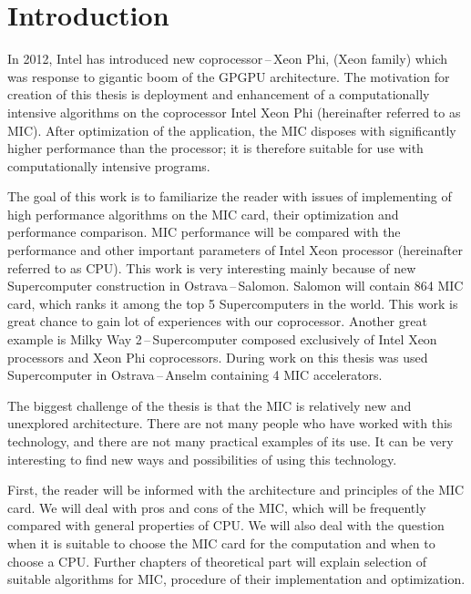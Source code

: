 

\chapter{Introduction}
In 2012, Intel has introduced new coprocessor\,--\,Xeon Phi, (Xeon family) which was response to gigantic boom of the GPGPU architecture. The motivation for creation of this thesis is deployment and enhancement of a computationally intensive algorithms on the coprocessor Intel Xeon Phi (hereinafter referred to as MIC). After optimization of the application, the MIC disposes with significantly higher performance than the processor; it is therefore suitable for use with computationally intensive programs.

\par The goal of this work is to familiarize the reader with issues of implementing of high performance algorithms on the MIC card, their optimization and performance comparison. MIC performance will be compared with the performance and other important parameters of Intel Xeon processor (hereinafter referred to as CPU). This work is very interesting mainly because of new Supercomputer construction in Ostrava\,--\,Salomon. Salomon will contain 864 MIC card, which ranks it among the top 5 Supercomputers in the world. This work is great chance to gain lot of experiences with our coprocessor. Another great example is Milky Way 2\,--\,Supercomputer composed exclusively of Intel Xeon processors and Xeon Phi coprocessors. During work on this thesis was used Supercomputer in Ostrava\,--\,Anselm containing 4 MIC accelerators.

\par The biggest challenge of the thesis is that the MIC is relatively new and unexplored architecture. There are not many people who have worked with this technology, and there are not many practical examples of its use. It can be very interesting to find new ways and possibilities of using this technology. 

\par First, the reader will be informed with the architecture and principles of the MIC card. We will deal with pros and cons of the MIC, which will be frequently compared with general properties of CPU. We will also deal with the question when it is suitable to choose the MIC card for the computation and when to choose a CPU. Further chapters of theoretical part will explain selection of suitable algorithms for MIC, procedure of their implementation and optimization.


